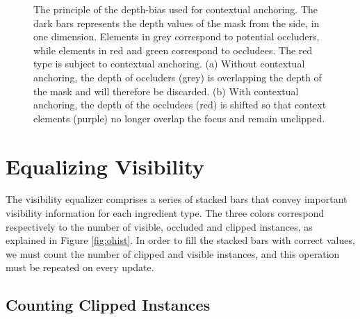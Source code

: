 \begin{figure}[t]
\centering
{}
\caption{\label{fig:islands} 
The principle of the depth-bias used for contextual anchoring.
The dark bars represents the depth values of the mask from the side, in one dimension. 
Elements in grey correspond to potential occluders, while elements in red and green correspond to occludees.
The red type is subject to contextual anchoring.
(a) Without contextual anchoring, the depth of occluders (grey) is overlapping the depth of the mask and will therefore be discarded. 
(b) With contextual anchoring, the depth of the occludees (red) is shifted so that context elements (purple) no longer overlap the focus and remain unclipped.}
\vspace{-3mm}
\end{figure}

\section{Equalizing Visibility}




The visibility equalizer comprises a series of stacked bars that convey important visibility information for each ingredient type.
The three colors correspond respectively to the number of visible, occluded and clipped instances, as explained in Figure \ref{fig:ohist}.
In order to fill the stacked bars with correct values, we must count the number of clipped and visible instances, and this operation must be repeated on every update.

\vspace{-2mm}
\subsection{Counting Clipped Instances}

